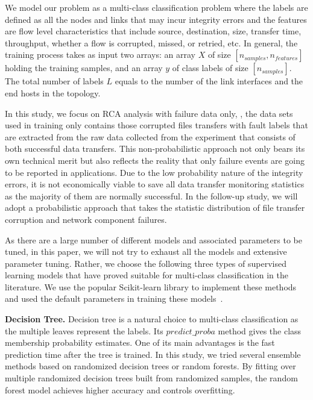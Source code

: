 We model our problem as a multi-class classification problem where the labels are defined as all the nodes and links that may incur integrity errors and the features are flow level characteristics that include source, destination, size, transfer time, throughput, whether a flow is corrupted, missed, or retried, etc. In general, the training process takes as input two arrays: an array $X$ of size $[n_{samples}, n_{features}]$ holding the training samples, and an array $y$ of class labels of size $[n_{samples}]$. The total number of labels $L$ equals to the number of the link interfaces and the end hosts in the topology.

In this study, we focus on RCA analysis with failure data only, \ie, the data sets used in training only contains those corrupted files transfers with fault labels that are extracted from the raw data collected from the experiment that consists of both successful data transfers. This non-probabilistic approach not only bears its own technical merit but also reflects the reality that only failure events are going to be reported in applications. Due to the low probability nature of the integrity errors, it is not economically viable to save all data transfer monitoring statistics as the majority of them are normally successful. In the follow-up study, we will adopt a probabilistic approach that takes the statistic distribution of file transfer corruption and network component failures.      

As there are a large number of different models and associated parameters to be tuned, in this paper, we will not try to exhaust all the models and extensive parameter tuning. Rather, we choose the following three types of supervised learning models that have proved suitable for multi-class classification in the literature. We use the popular Scikit-learn library to implement these methods and used the default parameters in training these models~\cite{Scikit:web}. 

{\bf Decision Tree.}  Decision tree is a natural choice to multi-class classification as the multiple leaves represent the labels. Its $predict\_proba$ method gives the class membership probability estimates. One of its main advantages is the fast prediction time after the tree is trained. In this study, we tried several ensemble methods based on randomized decision trees or random forests. By fitting over multiple randomized decision trees built from randomized samples, the random forest model achieves higher accuracy and controls overfitting. 


